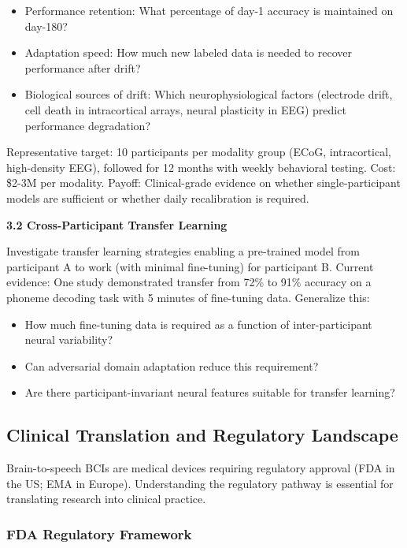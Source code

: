 \begin{itemize}
    \item Performance retention: What percentage of day-1 accuracy is maintained on day-180?
    \item Adaptation speed: How much new labeled data is needed to recover performance after drift?
    \item Biological sources of drift: Which neurophysiological factors (electrode drift, cell death in intracortical arrays, neural plasticity in EEG) predict performance degradation?
\end{itemize}

Representative target: 10 participants per modality group (ECoG, intracortical, high-density EEG), followed for 12 months with weekly behavioral testing. Cost: \$2-3M per modality. Payoff: Clinical-grade evidence on whether single-participant models are sufficient or whether daily recalibration is required.

\textbf{3.2 Cross-Participant Transfer Learning}

Investigate transfer learning strategies enabling a pre-trained model from participant A to work (with minimal fine-tuning) for participant B. Current evidence: One study demonstrated transfer from 72\% to 91\% accuracy on a phoneme decoding task with 5 minutes of fine-tuning data. Generalize this:

\begin{itemize}
    \item How much fine-tuning data is required as a function of inter-participant neural variability?
    \item Can adversarial domain adaptation reduce this requirement?
    \item Are there participant-invariant neural features suitable for transfer learning?
\end{itemize}

\subsection{Clinical Translation and Regulatory Landscape}
\label{sec:regulatory}

Brain-to-speech BCIs are medical devices requiring regulatory approval (FDA in the US; EMA in Europe). Understanding the regulatory pathway is essential for translating research into clinical practice.

\subsubsection{FDA Regulatory Framework}


